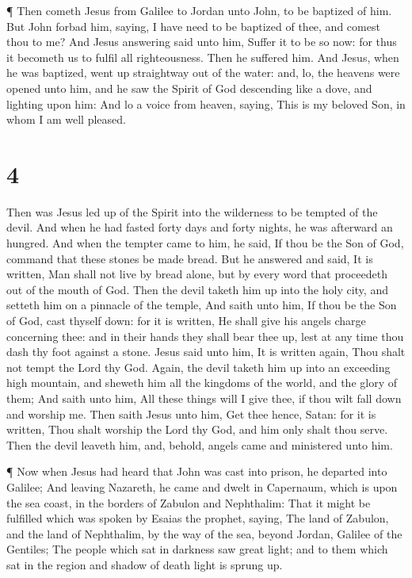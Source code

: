  ¶ Then cometh Jesus from Galilee to Jordan unto John, to
be baptized of him.  But John forbad him, saying, I have
need to be baptized of thee, and comest thou to me?  And
Jesus answering said unto him, Suffer it to be so now: for thus it
becometh us to fulfil all righteousness. Then he suffered him.
 And Jesus, when he was baptized, went up straightway out
of the water: and, lo, the heavens were opened unto him, and he saw the
Spirit of God descending like a dove, and lighting upon him:
 And lo a voice from heaven, saying, This is my beloved
Son, in whom I am well pleased.

\hypertarget{section-3}{%
\section{4}\label{section-3}}

 Then was Jesus led up of the Spirit into the wilderness to
be tempted of the devil.  And when he had fasted forty days
and forty nights, he was afterward an hungred.  And when the
tempter came to him, he said, If thou be the Son of God, command that
these stones be made bread.  But he answered and said, It is
written, Man shall not live by bread alone, but by every word that
proceedeth out of the mouth of God.  Then the devil taketh
him up into the holy city, and setteth him on a pinnacle of the temple,
 And saith unto him, If thou be the Son of God, cast thyself
down: for it is written, He shall give his angels charge concerning
thee: and in their hands they shall bear thee up, lest at any time thou
dash thy foot against a stone.  Jesus said unto him, It is
written again, Thou shalt not tempt the Lord thy God. 
Again, the devil taketh him up into an exceeding high mountain, and
sheweth him all the kingdoms of the world, and the glory of them;
 And saith unto him, All these things will I give thee, if
thou wilt fall down and worship me.  Then saith Jesus unto
him, Get thee hence, Satan: for it is written, Thou shalt worship the
Lord thy God, and him only shalt thou serve.  Then the
devil leaveth him, and, behold, angels came and ministered unto him.

 ¶ Now when Jesus had heard that John was cast into prison,
he departed into Galilee;  And leaving Nazareth, he came
and dwelt in Capernaum, which is upon the sea coast, in the borders of
Zabulon and Nephthalim:  That it might be fulfilled which
was spoken by Esaias the prophet, saying,  The land of
Zabulon, and the land of Nephthalim, by the way of the sea, beyond
Jordan, Galilee of the Gentiles;  The people which sat in
darkness saw great light; and to them which sat in the region and shadow
of death light is sprung up.

